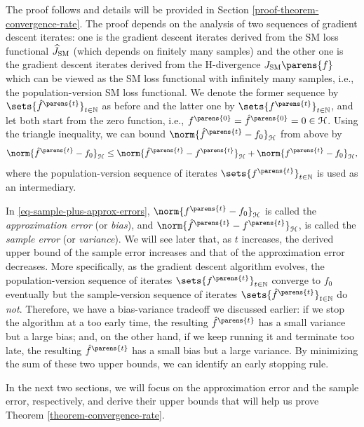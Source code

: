 The proof follows \textcite{Yao2007-ji} and details will be provided in Section \ref{proof-theorem-convergence-rate}. The proof depends on the analysis of two sequences of gradient descent iterates: one is the gradient descent iterates derived from the SM loss functional $\widehat{J}_{\mathrm{SM}}$ (which depends on finitely many samples) and the other one is the gradient descent iterates derived from the H-divergence $J_{\SM} \parens{f}$ which can be viewed as the SM loss functional with infinitely many samples, i.e., the population-version SM loss functional. We denote the former sequence by $\sets{\hat{f}^{\parens{t}}}_{t \in \Natural}$ as before and the latter one by $\sets{f^{\parens{t}}}_{t \in \Natural}$, and let both start from the zero function, i.e., $f^{\parens{0}} = \hat{f}^{\parens{0}} = 0 \in \calH$. Using the triangle inequality, we can bound $\norm{\hat{f}^{\parens{t}} - f_0}_{\calH}$ from above by 
\begin{align}\label{eq-sample-plus-approx-errors}
	\norm{\hat{f}^{\parens{t}} - f_0}_{\calH} \le \norm{\hat{f}^{\parens{t}} - f^{\parens{t}}}_{\calH} + \norm{f^{\parens{t}} - f_0}_{\calH}, 
\end{align}
where the population-version sequence of iterates $\sets{f^{\parens{t}}}_{t \in \Natural}$ is used as an intermediary. 

In \eqref{eq-sample-plus-approx-errors}, $\norm{f^{\parens{t}} - f_0}_{\calH}$ is called the \textit{approximation error} (or \textit{bias}), and $\norm{\hat{f}^{\parens{t}} - f^{\parens{t}}}_{\calH}$, is called the \textit{sample error} (or \textit{variance}). We will see later that, as $t$ increases, the derived upper bound of the sample error increases and that of the approximation error decreases. More specifically, as the gradient descent algorithm evolves, the population-version sequence of iterates $\sets{f^{\parens{t}}}_{t \in \Natural}$ converge to $f_0$ eventually but the sample-version sequence of iterates $\sets{\hat{f}^{\parens{t}}}_{t \in \Natural}$ do \emph{not}. Therefore, we have a bias-variance tradeoff we discussed earlier: if we stop the algorithm at a too early time, the resulting $\hat{f}^{\parens{t}}$ has a small variance but a large bias; and, on the other hand, if we keep running it and terminate too late, the resulting $\hat{f}^{\parens{t}}$ has a small bias but a large variance. By minimizing the sum of these two upper bounds, we can identify an early stopping rule. 

In the next two sections, we will focus on the approximation error and the sample error, respectively, and derive their upper bounds that will help us prove Theorem \ref{theorem-convergence-rate}. 

